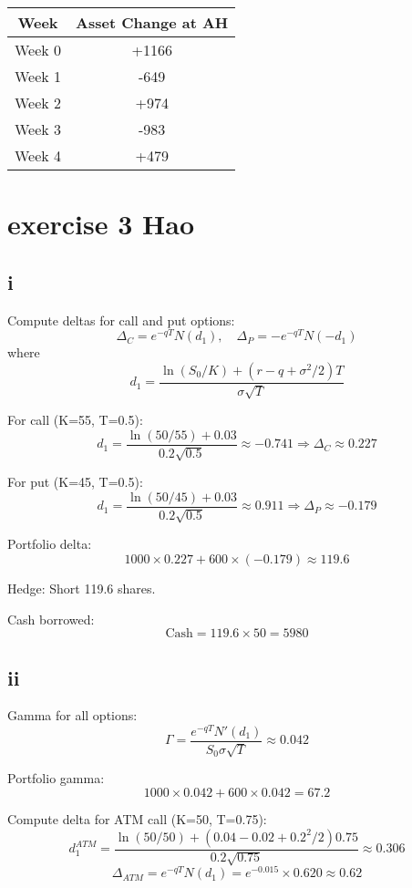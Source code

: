 \documentclass{article}
\begin{document}
\begin{tabular}{|c|c|}
    \hline
    \textbf{Week} & \textbf{Asset Change at AH} \\
    \hline
    Week 0        & +1166                       \\
    Week 1        & -649                        \\
    Week 2        & +974                        \\
    Week 3        & -983                        \\
    Week 4        & +479                        \\
    \hline
\end{tabular}


\section{exercise 3 Hao}
\subsection{i}
Compute deltas for call and put options:
\[
    \Delta_C = e^{-qT}N(d_1), \quad \Delta_P = -e^{-qT}N(-d_1)
\]
where
\[
    d_1 = \frac{\ln(S_0/K)+(r-q+\sigma^2/2)T}{\sigma\sqrt{T}}
\]

For call (K=55, T=0.5):
\[
    d_1 = \frac{\ln(50/55)+0.03}{0.2\sqrt{0.5}} \approx -0.741 \Rightarrow \Delta_C \approx 0.227
\]

For put (K=45, T=0.5):
\[
    d_1 = \frac{\ln(50/45)+0.03}{0.2\sqrt{0.5}} \approx 0.911 \Rightarrow \Delta_P \approx -0.179
\]

Portfolio delta:
\[
    1000\times0.227 + 600\times(-0.179) \approx 119.6
\]

Hedge: Short 119.6 shares.

Cash borrowed:
\[
    \text{Cash} = 119.6 \times 50 = 5980
\]

\subsection{ii}

Gamma for all options:
\[
    \Gamma = \frac{e^{-qT}N'(d_1)}{S_0\sigma\sqrt{T}} \approx 0.042
\]

Portfolio gamma:
\[
    1000\times0.042 + 600\times0.042 = 67.2
\]

Compute delta for ATM call (K=50, T=0.75):
\[
    d_1^{ATM} = \frac{\ln(50/50)+(0.04-0.02+0.2^2/2)0.75}{0.2\sqrt{0.75}} \approx 0.306
\]
\[
    \Delta_{ATM} = e^{-qT}N(d_1) = e^{-0.015}\times0.620 \approx 0.62
\]
\end{document}

